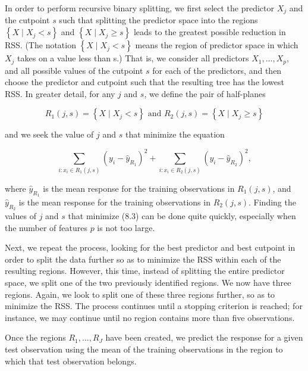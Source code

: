 \documentclass[10pt]{article}
\begin{document}
In order to perform recursive binary splitting, we first select the predictor $X_{j}$ and the cutpoint $s$ such that splitting the predictor space into the regions $\left\{X \mid X_{j}<s\right\}$ and $\left\{X \mid X_{j} \geq s\right\}$ leads to the greatest possible reduction in RSS. (The notation $\left\{X \mid X_{j}<s\right\}$ means the region of predictor space in which $X_{j}$ takes on a value less than s.) That is, we consider all predictors $X_{1}, \ldots, X_{p}$, and all possible values of the cutpoint $s$ for each of the predictors, and then choose the predictor and cutpoint such that the resulting tree has the lowest RSS. In greater detail, for any $j$ and $s$, we define the pair of half-planes


\begin{equation*}
R_{1}(j, s)=\left\{X \mid X_{j}<s\right\} \text { and } R_{2}(j, s)=\left\{X \mid X_{j} \geq s\right\} \tag{8.2}
\end{equation*}


and we seek the value of $j$ and $s$ that minimize the equation


\begin{equation*}
\sum_{i: x_{i} \in R_{1}(j, s)}\left(y_{i}-\hat{y}_{R_{1}}\right)^{2}+\sum_{i: x_{i} \in R_{2}(j, s)}\left(y_{i}-\hat{y}_{R_{2}}\right)^{2}, \tag{8.3}
\end{equation*}


where $\hat{y}_{R_{1}}$ is the mean response for the training observations in $R_{1}(j, s)$, and $\hat{y}_{R_{2}}$ is the mean response for the training observations in $R_{2}(j, s)$. Finding the values of $j$ and $s$ that minimize (8.3) can be done quite quickly, especially when the number of features $p$ is not too large.

Next, we repeat the process, looking for the best predictor and best cutpoint in order to split the data further so as to minimize the RSS within each of the resulting regions. However, this time, instead of splitting the entire predictor space, we split one of the two previously identified regions. We now have three regions. Again, we look to split one of these three regions further, so as to minimize the RSS. The process continues until a stopping criterion is reached; for instance, we may continue until no region contains more than five observations.

Once the regions $R_{1}, \ldots, R_{J}$ have been created, we predict the response for a given test observation using the mean of the training observations in the region to which that test observation belongs.
\end{document}
